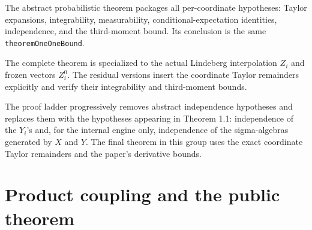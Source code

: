 \begin{theorem}\label{thm:probability-complete}
\leanok
The abstract probabilistic theorem packages all per-coordinate hypotheses:
Taylor expansions, integrability, measurability, conditional-expectation
identities, independence, and the third-moment bound.  Its conclusion is the
same \texttt{theoremOneOneBound}.
\end{theorem}

\begin{theorem}\label{thm:interpolation-complete}
\leanok
The complete theorem is specialized to the actual Lindeberg interpolation
\(Z_i\) and frozen vectors \(Z_i^0\).  The residual versions insert the
coordinate Taylor remainders explicitly and verify their integrability and
third-moment bounds.
\end{theorem}

\begin{theorem}\label{thm:paper-independence}
\leanok
The proof ladder progressively removes abstract independence hypotheses and
replaces them with the hypotheses appearing in Theorem 1.1: independence of the
\(Y_i\)'s and, for the internal engine only, independence of the sigma-algebras
generated by \(X\) and \(Y\).  The final theorem in this group uses the exact
coordinate Taylor remainders and the paper's derivative bounds.
\end{theorem}

\section{Product coupling and the public theorem}

